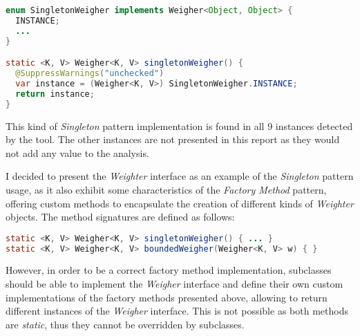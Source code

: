 \begin{lstlisting}[language=Java]
enum SingletonWeigher implements Weigher<Object, Object> {
  INSTANCE;
  ...
}

static <K, V> Weigher<K, V> singletonWeigher() {
  @SuppressWarnings("unchecked")
  var instance = (Weigher<K, V>) SingletonWeigher.INSTANCE;
  return instance;
}
\end{lstlisting}

\noindent This kind of \textit{Singleton} pattern implementation is found in all 9 instances detected by the tool. The other instances are not presented in this report as they would not add any value to the analysis.

I decided to present the \textit{Weighter} interface as an example of the \textit{Singleton} pattern usage, as it also exhibit some characteristics of the \textit{Factory Method} pattern, offering custom methods to encapsulate the creation of different kinds of \textit{Weighter} objects. The method signatures are defined as follows:

\begin{lstlisting}[language=Java]
static <K, V> Weigher<K, V> singletonWeigher() { ... }
static <K, V> Weigher<K, V> boundedWeigher(Weigher<K, V> w) { }
\end{lstlisting}

\noindent However, in order to be a correct factory method implementation, subclasses should be able to implement the \textit{Weigher} interface and define their own custom implementations of the factory methods presented above, allowing to return different instances of the \textit{Weigher} interface. This is not possible as both methods are \textit{static}, thus they cannot be overridden by subclasses.
